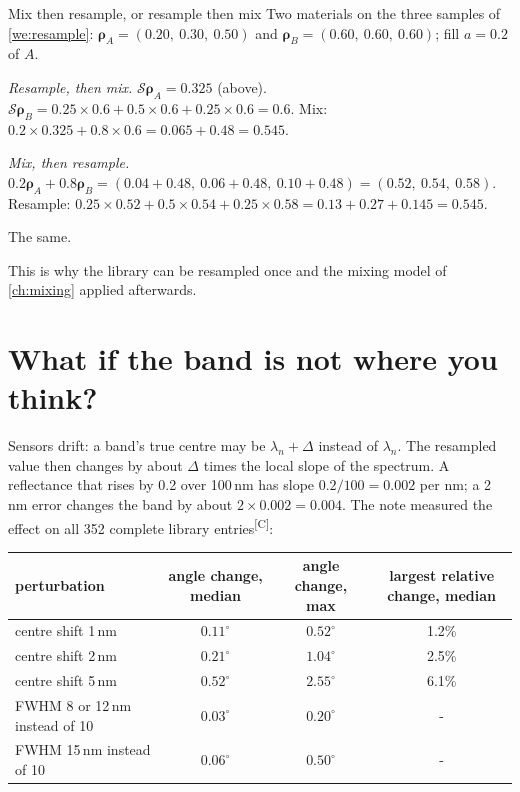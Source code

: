 \documentclass[11pt,a4paper,oneside,openany]{book}
\newcommand{\B}[1]{{\symbf{#1}}}
\newcommand{\B}[1]{{\bm{#1}}}
\newcommand{\comp}{\textsuperscript{\textsf{\scriptsize[C]}}}
\begin{document}
\begin{worked}[label=we:commute]{Mix then resample, or resample then mix}
Two materials on the three samples of \cref{we:resample}: $\B\rho_A=(0.20,\ 0.30,\ 0.50)$ and $\B\rho_B=(0.60,\ 0.60,\ 0.60)$; fill
$a=0.2$ of $A$.

\emph{Resample, then mix.} $\mathcal S\B\rho_A=0.325$ (above). $\mathcal S\B\rho_B=0.25\times0.6+0.5\times0.6+0.25\times0.6=0.6$. Mix:
$0.2\times0.325+0.8\times0.6=0.065+0.48=0.545$.

\emph{Mix, then resample.} $0.2\B\rho_A+0.8\B\rho_B=(0.04+0.48,\ 0.06+0.48,\ 0.10+0.48)=(0.52,\ 0.54,\ 0.58)$. Resample:
$0.25\times0.52+0.5\times0.54+0.25\times0.58=0.13+0.27+0.145=0.545$.

The same.
\end{worked}

This is why the library can be resampled once and the mixing model of \cref{ch:mixing} applied afterwards.

\section{What if the band is not where you think?}

Sensors drift: a band's true centre may be $\lambda_n+\Delta$ instead of $\lambda_n$. The resampled value then changes by about $\Delta$
times the local slope of the spectrum. A reflectance that rises by 0.2 over 100\,nm has slope $0.2/100=0.002$ per nm; a 2\,nm
error changes the band by about $2\times0.002=0.004$. The note measured the effect on all 352 complete library entries\comp:

\begin{center}\small
\begin{tabular}{@{}lccc@{}}
\toprule
perturbation & angle change, median & angle change, max & largest relative change, median\\
\midrule
centre shift 1\,nm & $0.11^\circ$ & $0.52^\circ$ & 1.2\%\\
centre shift 2\,nm & $0.21^\circ$ & $1.04^\circ$ & 2.5\%\\
centre shift 5\,nm & $0.52^\circ$ & $2.55^\circ$ & 6.1\%\\
FWHM 8 or 12\,nm instead of 10 & $0.03^\circ$ & $0.20^\circ$ & -\\
FWHM 15\,nm instead of 10 & $0.06^\circ$ & $0.50^\circ$ & -\\
\bottomrule
\end{tabular}
\end{center}
\end{document}
